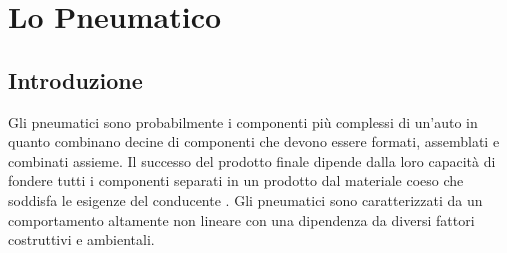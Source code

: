 \chapter{Lo Pneumatico}
\label{Pneumatico}
%
\section{Introduzione}
Gli pneumatici sono probabilmente i componenti più complessi di un'auto in quanto combinano decine di componenti che devono essere formati, assemblati e combinati assieme. Il successo del prodotto finale dipende dalla loro capacità di fondere tutti i componenti separati in un prodotto dal materiale coeso che soddisfa le esigenze del conducente \cite{rill}. Gli pneumatici sono caratterizzati da un comportamento altamente non lineare con una dipendenza da diversi fattori costruttivi e ambientali.
%

